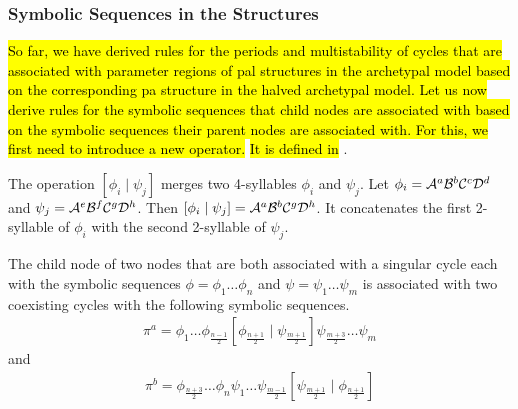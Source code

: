 \subsubsection{Symbolic Sequences in the  Structures}

\hl{
	So far, we have derived rules for the periods and multistability of cycles that are associated with parameter regions of \gls{pal} structures in the archetypal model based on the corresponding \gls{pa} structure in the halved archetypal model.
	Let us now derive rules for the symbolic sequences that child nodes are associated with based on the symbolic sequences their parent nodes are associated with.
	For this, we first need to introduce a new operator.
}
\hl{It is defined in} .

\begin{definition}
	\label{def:merge}
	The operation $\left[\phi_i \mid \psi_j\right]$ merges two 4-syllables $\phi_i$ and $\psi_j$.
	Let $\phi_i = \mathcal{A}^a\mathcal{B}^b\mathcal{C}^c\mathcal{D}^d$ and $\psi_j = \mathcal{A}^e\mathcal{B}^f\mathcal{C}^g\mathcal{D}^h$.
	Then $\left[\phi_i \mid \psi_j\right] = \mathcal{A}^a\mathcal{B}^b\mathcal{C}^g\mathcal{D}^h$.
	It concatenates the first 2-syllable of $\phi_i$ with the second 2-syllable of $\psi_j$.
\end{definition}

\begin{theorem}
	\label{theorem:child.symbolic.1}
	The child node of two nodes that are both associated with a singular cycle each with the symbolic sequences $\phi = \phi_1 \dots \phi_n$ and $\psi = \psi_1 \dots \psi_m$ is associated with two coexisting cycles with the following symbolic sequences.
	\begin{align}
		\pi^a = \phi_1 \dots \phi_{\frac{n-1}{2}} \left[\phi_{\frac{n+1}{2}} \mid \psi_{\frac{m+1}{2}}\right] \psi_{\frac{m+3}{2}} \dots \psi_m
	\end{align}
	and
	\begin{align}
		\pi^b = \phi_{\frac{n+3}{2}} \dots \phi_n \psi_1 \dots \psi_{\frac{m-1}{2}} \left[\psi_{\frac{m+1}{2}} \mid \phi_{\frac{n+1}{2}}\right]
	\end{align}
\end{theorem}


